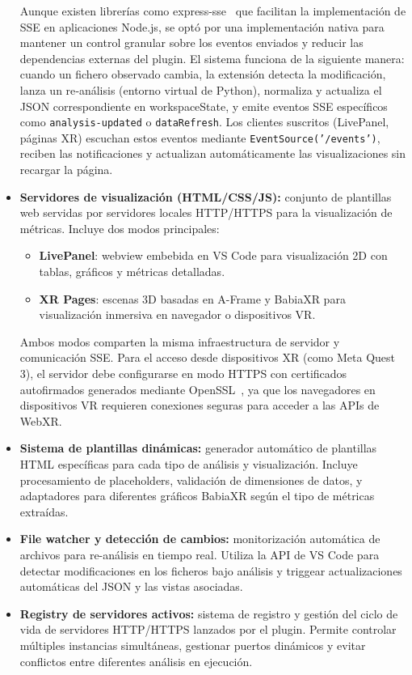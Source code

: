 \documentclass[a4paper, 12pt]{book}
\begin{document}
\begin{itemize}
  Aunque existen librerías como express-sse~\cite{express-sse} que facilitan la implementación de SSE en aplicaciones Node.js, se optó por una implementación nativa para mantener un control granular sobre los eventos enviados y reducir las dependencias externas del plugin. El sistema funciona de la siguiente manera: cuando un fichero observado cambia, la extensión detecta la modificación, lanza un re‑análisis (entorno virtual de Python), normaliza y actualiza el JSON correspondiente en workspaceState, y emite eventos SSE específicos como \texttt{analysis-updated} o \texttt{dataRefresh}. Los clientes suscritos (LivePanel, páginas XR) escuchan estos eventos mediante \texttt{EventSource('/events')}, reciben las notificaciones y actualizan automáticamente las visualizaciones sin recargar la página.
  \item \textbf{Servidores de visualización (HTML/CSS/JS):} conjunto de plantillas web servidas por servidores locales HTTP/HTTPS para la visualización de métricas. Incluye dos modos principales:
  \begin{itemize}
    \item \textbf{LivePanel}: webview embebida en VS Code para visualización 2D con tablas, gráficos y métricas detalladas.
    \item \textbf{XR Pages}: escenas 3D basadas en A-Frame y BabiaXR para visualización inmersiva en navegador o dispositivos VR.
  \end{itemize}
  Ambos modos comparten la misma infraestructura de servidor y comunicación SSE. Para el acceso desde dispositivos XR (como Meta Quest 3), el servidor debe configurarse en modo HTTPS con certificados autofirmados generados mediante OpenSSL~\cite{openssl}, ya que los navegadores en dispositivos VR requieren conexiones seguras para acceder a las APIs de WebXR.
  \item \textbf{Sistema de plantillas dinámicas:} generador automático de plantillas HTML específicas para cada tipo de análisis y visualización. Incluye procesamiento de placeholders, validación de dimensiones de datos, y adaptadores para diferentes gráficos BabiaXR según el tipo de métricas extraídas.
  \item \textbf{File watcher y detección de cambios:} monitorización automática de archivos para re-análisis en tiempo real. Utiliza la API de VS Code para detectar modificaciones en los ficheros bajo análisis y triggear actualizaciones automáticas del JSON y las vistas asociadas.
  \item \textbf{Registry de servidores activos:} sistema de registro y gestión del ciclo de vida de servidores HTTP/HTTPS lanzados por el plugin. Permite controlar múltiples instancias simultáneas, gestionar puertos dinámicos y evitar conflictos entre diferentes análisis en ejecución.
\end{itemize}
\end{document}
